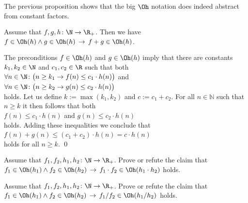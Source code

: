 \remark 
The previous proposition shows that the big $\Oh$ notation does indeed abstract
from constant factors. \eoxs

\begin{Proposition}
Assume that $f,g,h \colon \N \rightarrow {\R_+}$. Then we have 
\\[0.2cm]
\hspace*{1.3cm}
$f \in \Oh(h) \wedge g \in \Oh(h) \,\rightarrow\, f + g \in \Oh(h)$.
\end{Proposition}

\proof
The preconditions $f \in \Oh(h)$ and $g \in \Oh(h)$ imply that there are constants $k_1,k_2\in \N$
and $c_1,c_2\in \R$ such that both \\[0.2cm]
\hspace*{1.3cm} 
$\forall n \in \N \colon \bigl( n \geq k_1 \rightarrow f(n) \leq c_1 \cdot h(n)\bigr)$ 
\quad and
\\[0.2cm]
\hspace*{1.3cm} 
$\forall n \in \N \colon\bigl( n \geq k_2 \rightarrow g(n) \leq c_2 \cdot h(n)\bigr)$
\\[0.2cm]
holds.  Let us define $k := \max(k_1,k_2)$ and $c:= c_1 + c_2$.  For all $n \in \mathbb{N}$ such
that $n \geq k$ it then follows that both
\\[0.2cm]
\hspace*{1.3cm}
 $f(n) \leq c_1 \cdot h(n)$ \quad and \quad  $g(n) \leq c_2 \cdot h(n)$
\\[0.2cm]
holds.  Adding these inequalities we conclude that 
\\[0.2cm]
\hspace*{1.3cm} $f(n) + g(n) \leq (c_1 + c_2) \cdot h(n) = c \cdot h(n)$
\\[0.2cm]
holds for all $n \geq k$.
\qed

\exercise
Assume that $f_1,f_2,h_1,h_2 \colon \N \rightarrow {\R_+}$.  Prove or refute the claim that 
\\[0.2cm]
\hspace*{1.3cm}
$f_1 \in \Oh(h_1) \wedge f_2 \in \Oh(h_2) \,\rightarrow\, f_1 \cdot f_2 \in \Oh(h_1 \cdot h_2)$
\quad holds.  \eoxs


\exercise
Assume that $f_1,f_2,h_1,h_2 \colon \N \rightarrow {\R_+}$.  Prove or refute the claim that 
\\[0.2cm]
\hspace*{1.3cm}
$f_1 \in \Oh(h_1) \wedge f_2 \in \Oh(h_2) \,\rightarrow\, f_1 / f_2 \in \Oh(h_1 / h_2)$
\quad holds.  \eoxs

